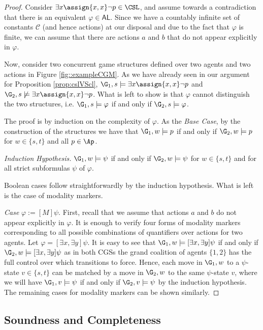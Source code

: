 \begin{proof}
  Consider $\exists x \assign{x, x} \lnot p \in \CSL$, and assume towards a contradiction that there is an equivalent $\varphi \in \mathsf{AL}$. Since we have a countably infinite set of constants $\mathcal{C}$ (and hence actions) at our disposal  and due to the fact that $\varphi$ is finite, we can assume that there are actions $a$ and $b$ that do not appear explicitly in $\varphi$. 

Now, consider two concurrent game structures defined over two agents and two actions in Figure \ref{fig::exampleCGM}. As we have already seen in our argument for Proposition \ref{prop:cslVScl}, $\G_1,s \models \exists x \assign{x, x} \lnot p$ and $\G_2,s \not \models \exists x \assign{x, x} \lnot p$. What is left to show is that $\varphi$ cannot distinguish the two structures, i.e. $\G_1,s \models \varphi$ if and only if $\G_2, s \models \varphi$. 

       The proof is by induction on the complexity of $\varphi$. As the \textit{Base Case}, by the construction of the structures we have that $\G_1,w \models p$ if and only if $\G_2,w \models p$ for $w \in \{s,t\}$ and all $p \in \Ap$. 

    \textit{Induction Hypothesis.} $\G_1,w \models \psi$ if and only if $\G_2, w \models \psi$  for $w \in \{s,t\}$ and for all strict subformulas $\psi$ of $\varphi$.
    
    Boolean cases follow straightforwardly by the induction hypothesis. What is left is the case of modality markers. 

   \textit{Case } $\varphi := [M]\psi$. First, recall that we assume that actions $a$ and $b$ do not appear explicitly in $\varphi$. It is enough to verify four forms of modality markers corresponding to all possible combinations of quantifiers over actions for two agents. Let $\varphi = [\exists x, \exists y] \psi$. It is easy to see that  $\G_1,w \models [\exists x, \exists y] \psi$ if and only if $\G_2,w \models [\exists x, \exists y] \psi$ as in both CGSs the grand coalition of agents $\{1,2\}$ has the full control over which transitions to force. Hence, each move in $\G_1,w$ to a $\psi$-state $v \in \{s,t\}$ can be matched by a move in  $\G_2,w$ to the same $\psi$-state $v$, where we will have $\G_1,v \models \psi$ if and only if $\G_2,v \models \psi$ by the induction hypothesis. 
   The remaining cases for modality markers can be shown similarly.
\end{proof}

\subsection*{Soundness and Completeness}


